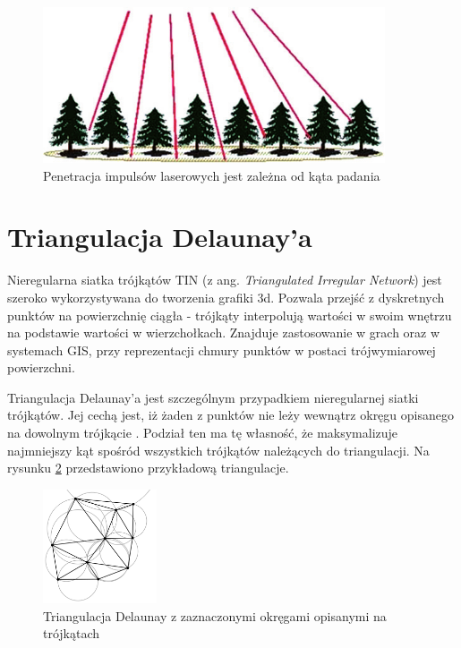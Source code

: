\begin{figure}[h!]
    \centering
    \includegraphics[width=0.9\textwidth]{img/lidar_tree.png}
    \caption{Penetracja impulsów laserowych jest zależna od kąta padania}
    \label{fig:lidar_tree}
\end{figure}


\section{Triangulacja Delaunay'a}

Nieregularna siatka trójkątów TIN (z ang. \textit{Triangulated Irregular Network}) jest szeroko wykorzystywana do tworzenia grafiki 3d.
Pozwala przejść z dyskretnych punktów na powierzchnię ciągła - trójkąty interpolują wartości w swoim wnętrzu na podstawie wartości w
wierzchołkach. Znajduje zastosowanie w grach oraz w systemach GIS, przy reprezentacji chmury punktów w postaci trójwymiarowej powierzchni.

Triangulacja Delaunay'a jest szczególnym przypadkiem nieregularnej siatki trójkątów.
Jej cechą jest, iż żaden z punktów nie leży wewnątrz okręgu opisanego na dowolnym trójkącie \cite{Lee1980}. Podział ten ma tę własność, że maksymalizuje najmniejszy kąt spośród 
wszystkich trójkątów należących do triangulacji. Na rysunku \ref{fig:triangulacja} przedstawiono przykładową triangulacje.

\begin{figure}[h!]
    \centering
    \includegraphics[width=0.3\textwidth]{img/triangulacja.jpg}
    \caption{Triangulacja Delaunay z zaznaczonymi okręgami opisanymi na trójkątach}
    \label{fig:triangulacja}
\end{figure}

